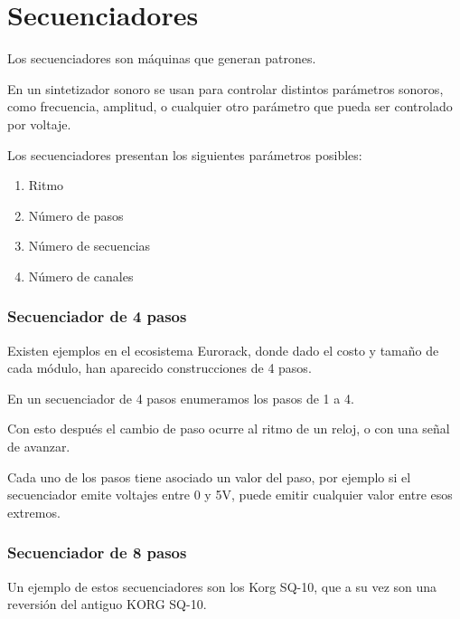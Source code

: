 \documentclass[../principal.tex]{subfiles}
\begin{document}
\chapter{Secuenciadores}

Los secuenciadores son máquinas que generan patrones.

En un sintetizador sonoro se usan para controlar distintos parámetros sonoros, como frecuencia, amplitud, o cualquier otro parámetro que pueda ser controlado por voltaje.

Los secuenciadores presentan los siguientes parámetros posibles:

\begin{enumerate}
    \item Ritmo
    \item Número de pasos
    \item Número de secuencias
    \item Número de canales
\end{enumerate}

\subsection{Secuenciador de 4 pasos}

Existen ejemplos en el ecosistema Eurorack, donde dado el costo y tamaño de cada módulo, han aparecido construcciones de 4 pasos.

En un secuenciador de 4 pasos enumeramos los pasos de 1 a 4.

Con esto después el cambio de paso ocurre al ritmo de un reloj, o con una señal de avanzar.

Cada uno de los pasos tiene asociado un valor del paso, por ejemplo si el secuenciador emite voltajes entre 0 y 5V, puede emitir cualquier valor entre esos extremos.

\subsection{Secuenciador de 8 pasos}

Un ejemplo de estos secuenciadores son los Korg SQ-10, que a su vez son una reversión del antiguo KORG SQ-10.

\newpage
\end{document}
